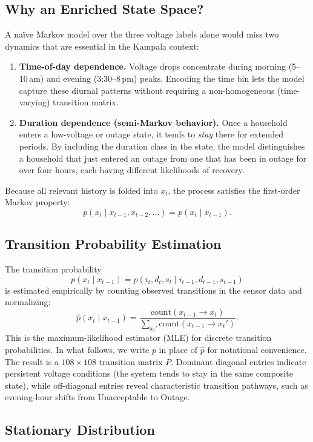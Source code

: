 \documentclass[11pt]{article}
\begin{document}
\subsection{Why an Enriched State Space?}

A na\"ive Markov model over the three voltage labels alone would miss two dynamics that are essential in the Kampala context:
\begin{enumerate}
    \item \textbf{Time-of-day dependence.} Voltage drops concentrate during morning (5--10\,am) and evening (3:30--8\,pm) peaks. Encoding the time bin lets the model capture these diurnal patterns without requiring a non-homogeneous (time-varying) transition matrix.
    \item \textbf{Duration dependence (semi-Markov behavior).} Once a household enters a low-voltage or outage state, it tends to \emph{stay} there for extended periods. By including the duration class in the state, the model distinguishes a household that just entered an outage from one that has been in outage for over four hours, each having different likelihoods of recovery.
\end{enumerate}
Because all relevant history is folded into $x_t$, the process satisfies the first-order Markov property:
\[
    p(x_t \mid x_{t-1}, x_{t-2}, \ldots) = p(x_t \mid x_{t-1}).
\]

\subsection{Transition Probability Estimation}

The transition probability
\[
    p(x_t \mid x_{t-1}) = p(i_t, d_t, s_t \mid i_{t-1}, d_{t-1}, s_{t-1})
\]
is estimated empirically by counting observed transitions in the sensor data and normalizing:
\[
    \hat{p}(x_t \mid x_{t-1})
    = \frac{\mathrm{count}(x_{t-1} \to x_t)}
           {\displaystyle\sum_{x_t'}\mathrm{count}(x_{t-1} \to x_t')}.
\]
This is the maximum-likelihood estimator (MLE) for discrete transition probabilities. In what follows, we write $p$ in place of $\hat{p}$ for notational convenience.
The result is a $108 \times 108$ transition matrix $P$. Dominant diagonal entries indicate persistent voltage conditions (the system tends to stay in the same composite state), while off-diagonal entries reveal characteristic transition pathways, such as evening-hour shifts from Unacceptable to Outage.

\subsection{Stationary Distribution}
\end{document}
